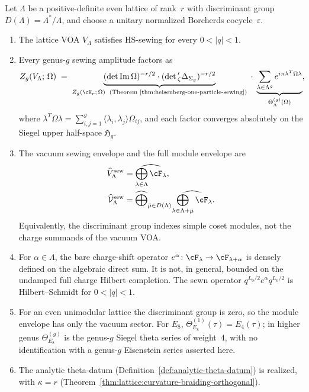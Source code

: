 \begin{theorem}\label{thm:lattice-sewing}%
%
%
Let\/ $\Lambda$ be a positive-definite even lattice of rank~$r$
with discriminant group $D(\Lambda) = \Lambda^*/\Lambda$, and choose
a unitary normalized Borcherds cocycle~$\varepsilon$.
\begin{enumerate}[label=\textup{(\roman*)}]
\item The lattice VOA\/ $V_\Lambda$ satisfies HS-sewing for
 every\/ $0 < |q| < 1$.
\item Every genus-$g$ sewing amplitude factors as
\begin{equation}\label{eq:lattice-sewing-factorization}
Z_g(V_\Lambda;\, \Omega)
\;=\;
\underbrace{(\det\operatorname{Im}\Omega)^{-r/2}
\cdot (\det{}'_\zeta \Delta_{\Sigma_g})^{-r/2}}_{%
 Z_g(\cH_r;\,\Omega)\text{\;
 \textup{(}Theorem~\textup{\ref{thm:heisenberg-one-particle-sewing})}}}
\;\cdot\;
\underbrace{\sum_{\lambda \in \Lambda^g}
 e^{i\pi \lambda^T \Omega \lambda}}_{%
 \Theta_\Lambda^{(g)}(\Omega)},
\end{equation}
where
$\lambda^T\Omega\lambda =
\sum_{i,j=1}^g\langle\lambda_i,\lambda_j\rangle\Omega_{ij}$,
and each factor converges absolutely on the Siegel upper
half-space $\mathfrak{H}_g$.
\item The vacuum sewing envelope and the full module envelope are
\begin{align}
\widehat V_{\Lambda}^{\mathrm{sew}}
&=
\widehat{\bigoplus_{\lambda\in\Lambda}\cF_\lambda},
\label{eq:lattice-vacuum-sewing-envelope}\\
\widehat{\mathcal V}_{\Lambda}^{\mathrm{sew}}
&=
\widehat{\bigoplus}_{\bar\mu\in D(\Lambda)}
\widehat{\bigoplus_{\lambda\in\Lambda+\mu}\cF_\lambda}.
\label{eq:lattice-module-sewing-envelope}
\end{align}
Equivalently, the discriminant group indexes simple coset modules,
not the charge summands of the vacuum VOA.
\item For $\alpha\in\Lambda$, the bare charge-shift operator
$e^\alpha\colon \cF_\lambda\to\cF_{\lambda+\alpha}$ is densely
defined on the algebraic direct sum. It is not, in general, bounded
on the undamped full charge Hilbert completion. The sewn operator
$q^{L_0/2}e^\alpha q^{L_0/2}$ is Hilbert--Schmidt for
$0<|q|<1$.
\item For an even unimodular lattice the discriminant group is zero,
so the module envelope has only the vacuum sector. For $E_8$,
$\Theta_{E_8}^{(1)}(\tau)=E_4(\tau)$; in higher genus
$\Theta_{E_8}^{(g)}$ is the genus-$g$ Siegel theta series of
weight~$4$, with no identification with a genus-$g$ Eisenstein
series asserted here.
\item The analytic theta-datum
\textup{(}Definition~\textup{\ref{def:analytic-theta-datum}}\textup{)}
is realized, with $\kappa = r$
\textup{(}Theorem~\textup{\ref{thm:lattice:curvature-braiding-orthogonal}}\textup{)}.
\end{enumerate}
\end{theorem}

